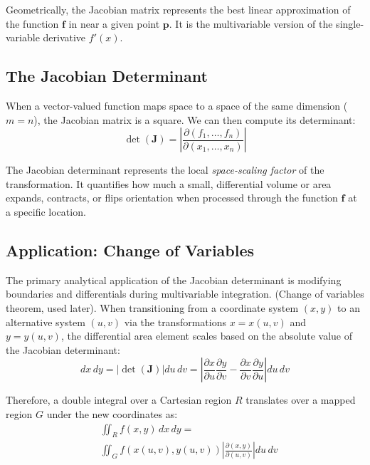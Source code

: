 Geometrically, 
the Jacobian matrix represents the best linear approximation of the function $\mathbf{f}$ 
in near a given point $\mathbf{p}$. 
It is the multivariable version of the single-variable derivative $f'(x)$.

\subsection{The Jacobian Determinant}
When a vector-valued function maps space to a space of the same dimension ($m = n$), 
the Jacobian matrix is a square. 
We can then compute its determinant:
\begin{equation}
    \det(\mathbf{J}) = \left| \frac{\partial(f_1, \dots, f_n)}{\partial(x_1, \dots, x_n)} \right|
\end{equation}

The Jacobian determinant represents the local \textit{space-scaling factor} of the transformation. 
It quantifies how much a small, differential volume or area expands, contracts, or flips orientation 
when processed through the function $\mathbf{f}$ at a specific location.

\subsection{Application: Change of Variables}
The primary analytical application of the Jacobian determinant is modifying boundaries and differentials 
during multivariable integration. (Change of variables theorem, used later).
When transitioning from a coordinate system $(x,y)$ to an alternative system $(u,v)$ via the transformations $x = x(u,v)$ 
and $y = y(u,v)$, the differential area element scales based on the absolute value of the Jacobian determinant:
\begin{equation}
    dx \, dy = \left| \det(\mathbf{J}) \right| du \, dv = \left| \frac{\partial x}{\partial u}\frac{\partial y}{\partial v} - \frac{\partial x}{\partial v}\frac{\partial y}{\partial u} \right| du \, dv
\end{equation}

Therefore, a double integral over a Cartesian region $R$ 
translates over a mapped region $G$ under the new coordinates as:
\begin{align}
    &\iint_R f(x, y) \, dx \, dy = \\
    &\iint_G f(x(u,v), y(u,v)) \left| \frac{\partial(x, y)}{\partial(u, v)} \right| du \, dv
\end{align}





